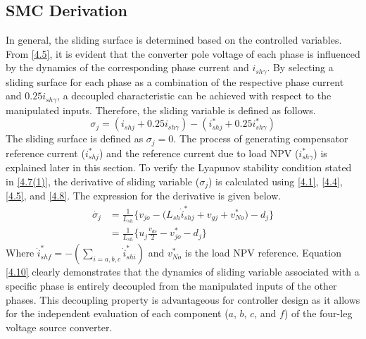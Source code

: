 \subsection{SMC Derivation} \label{4.SMC Derivation}
In general, the sliding surface is determined based on the controlled variables. From \eqref{4.5}, it is evident that the converter pole voltage of each phase is influenced by the dynamics of the corresponding phase current and $i_{sh\gamma}$. By selecting a sliding surface for each phase as a combination of the respective phase current and $0.25i_{sh\gamma}$, a decoupled characteristic can be achieved with respect to the manipulated inputs. Therefore, the sliding variable is defined as follows. 
\begin{equation} \label{4.8}
	\sigma_{j} = (i_{shj}+0.25i_{sh\gamma}) - (i^{*}_{shj}+0.25i^{*}_{sh\gamma}) 
\end{equation}
The sliding surface is defined as $\sigma_{j}=0$. The process of generating compensator reference current ($i^{*}_{shj}$) and the reference current due to load NPV ($i^{*}_{sh\gamma}$) is explained later in this section.
To verify the Lyapunov stability condition stated in \eqref{4.7(1)}, the derivative of sliding variable ($\sigma_{j} $) is calculated using \eqref{4.1}, \eqref{4.4}, \eqref{4.5}, and \eqref{4.8}. The expression for the derivative is given below. 
\begin{equation}\label{4.10}
	\begin{aligned}
		\dot{\sigma_{j}} &= \frac{1}{L_{sh}}\Big\{ v_{jo} - \big(L_{sh} \dot{i}^{*}_{shj} + v_{gj} + v^{*}_{No} \big) - d_{j} \Big\} \\
		& = \frac{1}{L_{sh}}\Big\{ u_{j}\frac{v_{dc}}{2} - v^{*}_{jo} - d_{j} \Big\}
	\end{aligned}
\end{equation}
Where $\dot{i}^{*}_{shf} = - \left(\sum_{i=a,b,c}^{}\dot{i}^{*}_{shi}\right) $ and $v^{*}_{No}$ is the load NPV reference. Equation \eqref{4.10} clearly demonstrates that the dynamics of sliding variable associated with a specific phase is entirely decoupled from the manipulated inputs of the other phases. This decoupling property is advantageous for controller design as it allows for the independent evaluation of each component ($a$, $b$, $c$, and $f$) of the four-leg voltage source converter. 

